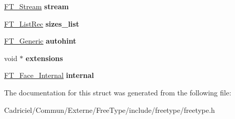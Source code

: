 \begin{DoxyCompactItemize}
\item 
\hyperlink{struct_f_t___stream_rec__}{F\+T\+\_\+\+Stream} {\bfseries stream}\hypertarget{struct_f_t___face_rec___a831d5da25cd0fe2a783d2a73f467de55}{}\label{struct_f_t___face_rec___a831d5da25cd0fe2a783d2a73f467de55}

\item 
\hyperlink{struct_f_t___list_rec__}{F\+T\+\_\+\+List\+Rec} {\bfseries sizes\+\_\+list}\hypertarget{struct_f_t___face_rec___a47504203e02bfba59c802c35cb4009ed}{}\label{struct_f_t___face_rec___a47504203e02bfba59c802c35cb4009ed}

\item 
\hyperlink{struct_f_t___generic__}{F\+T\+\_\+\+Generic} {\bfseries autohint}\hypertarget{struct_f_t___face_rec___a34ba9b1367f1b2d13676043b8da3ea73}{}\label{struct_f_t___face_rec___a34ba9b1367f1b2d13676043b8da3ea73}

\item 
void $\ast$ {\bfseries extensions}\hypertarget{struct_f_t___face_rec___a8b24f993e38da597d3e0273267890f49}{}\label{struct_f_t___face_rec___a8b24f993e38da597d3e0273267890f49}

\item 
\hyperlink{struct_f_t___face___internal_rec__}{F\+T\+\_\+\+Face\+\_\+\+Internal} {\bfseries internal}\hypertarget{struct_f_t___face_rec___aed9a1267cddcbe790f0591471c886537}{}\label{struct_f_t___face_rec___aed9a1267cddcbe790f0591471c886537}

\end{DoxyCompactItemize}


The documentation for this struct was generated from the following file\+:\begin{DoxyCompactItemize}
\item 
Cadriciel/\+Commun/\+Externe/\+Free\+Type/include/freetype/freetype.\+h\end{DoxyCompactItemize}
